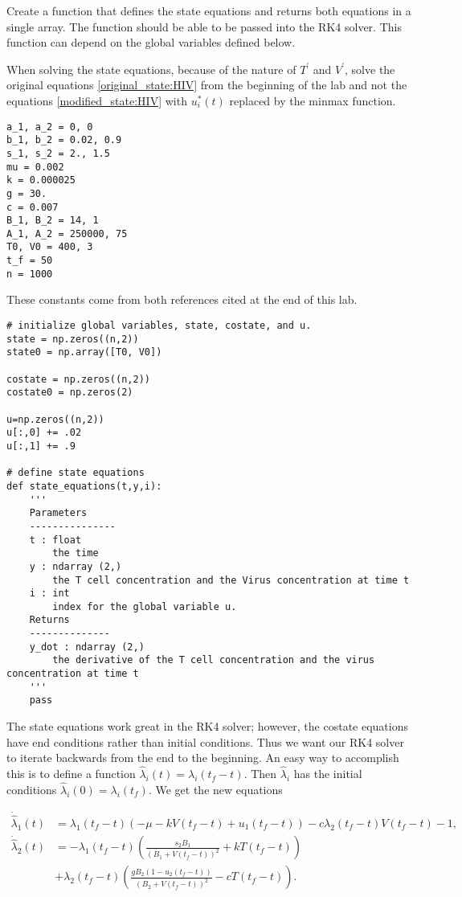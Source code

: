 \begin{problem}
Create a function that defines the state equations and returns both equations in a single array. The function should be able to be passed into the RK4 solver. This function can depend on the global variables defined below.

\begin{warn}
When solving the state equations, because of the nature of $T^\prime$ and $V^\prime$, solve the original equations \eqref{original_state:HIV} from the beginning of the lab and not the equations \eqref{modified_state:HIV} with $u_i^*(t)$ replaced by the minmax function.
\end{warn}

\begin{lstlisting}
a_1, a_2 = 0, 0
b_1, b_2 = 0.02, 0.9
s_1, s_2 = 2., 1.5
mu = 0.002
k = 0.000025
g = 30.
c = 0.007
B_1, B_2 = 14, 1
A_1, A_2 = 250000, 75
T0, V0 = 400, 3
t_f = 50
n = 1000
\end{lstlisting}
These constants come from both references cited at the end of this lab. 

\begin{lstlisting}
# initialize global variables, state, costate, and u.
state = np.zeros((n,2))
state0 = np.array([T0, V0])
	
costate = np.zeros((n,2))
costate0 = np.zeros(2)

u=np.zeros((n,2))
u[:,0] += .02
u[:,1] += .9

# define state equations
def state_equations(t,y,i):
	'''
	Parameters
	---------------
	t : float
		the time
	y : ndarray (2,)
		the T cell concentration and the Virus concentration at time t
	i : int
		index for the global variable u.
	Returns
	--------------
	y_dot : ndarray (2,)
		the derivative of the T cell concentration and the virus concentration at time t
	'''
	pass
\end{lstlisting}
\label{problem:hiv:state}
\end{problem}


The state equations work great in the RK4 solver; however, the costate equations have end conditions rather than initial conditions. Thus we want our RK4 solver to iterate backwards from the end to the beginning. An easy way to accomplish this is to define a function $ \hat{\lambda}_i(t)=\lambda_i(t_f - t).$ Then $\hat{\lambda}_i$ has the initial conditions $\hat{\lambda}_i(0) = \lambda_i(t_f)$. We get the new equations

\begin{align*}
\dot{\hat{\lambda}}_1(t) &=\lambda_1(t_f-t)\left(-\mu - kV(t_f-t) + u_{1}(t_f-t)\right) - c\lambda_2(t_f-t)V(t_f-t) - 1, \\
\dot{\hat{\lambda}}_2(t) &= -\lambda_1(t_f-t)\left(\frac{s_2B_1}{(B_1+V(t_f-t))^2}+kT(t_f-t)\right) \\
&+ \lambda_2(t_f-t)\left(\frac{gB_2(1-u_2(t_f-t))}{(B_2 + V(t_f-t))^2} - cT(t_f-t)\right).
\end{align*}

